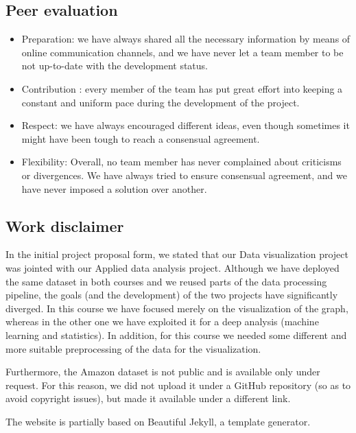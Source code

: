 \documentclass[a4paper,12pt]{article}
\begin{document}
\subsection{Peer evaluation}
\begin{itemize}
	\item Preparation: we have always shared all the necessary information by means of online communication channels, and we have never let a team member to be not up-to-date with the development status.
	\item Contribution : every member of the team has put great effort into keeping a constant and uniform pace during the development of the project.
	\item Respect: we have always encouraged different ideas, even though sometimes it might have been tough to reach a consensual agreement. 
	\item Flexibility: Overall, no team member has never complained about criticisms or divergences. We have always tried to ensure consensual agreement, and we have never imposed a solution over another.
\end{itemize}

\subsection{Work disclaimer}
In the initial project proposal form, we stated that our Data visualization project was jointed with our Applied data analysis project. Although we have deployed the same dataset in both courses and we reused parts of the data processing pipeline, the goals (and the development) of the two projects have significantly diverged. In this course we have focused merely on the visualization of the graph, whereas in the other one we have exploited it for a deep analysis (machine learning and statistics). In addition, for this course we needed some different and more suitable preprocessing of the data for the visualization.

Furthermore, the Amazon dataset is not public and is available only under request. For this reason, we did not upload it under a GitHub repository (so as to avoid copyright issues), but made it available under a different link.

The website is partially based on Beautiful Jekyll, a template generator.
\end{document}
